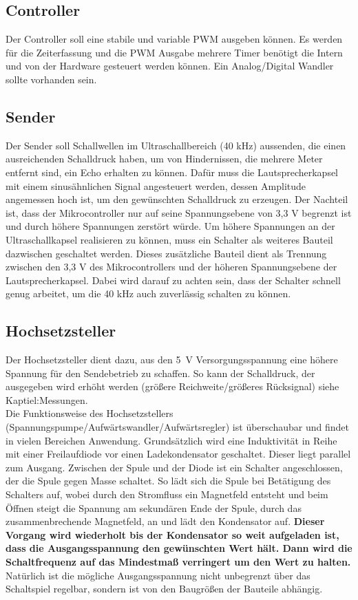 \subsection{Controller}
Der Controller soll eine stabile und variable PWM ausgeben können. Es werden für die Zeiterfassung und die PWM Ausgabe mehrere Timer benötigt die Intern und von der Hardware gesteuert werden können. Ein Analog/Digital Wandler sollte vorhanden sein.

\subsection{Sender}
Der Sender soll Schallwellen im Ultraschallbereich (40 kHz) aussenden, die einen ausreichenden Schalldruck haben, um von Hindernissen, die mehrere Meter entfernt sind, ein Echo erhalten zu können.
Dafür muss die Lautsprecherkapsel mit einem sinusähnlichen Signal angesteuert werden, dessen Amplitude angemessen hoch ist, um den gewünschten Schalldruck zu erzeugen. Der Nachteil ist, dass der Mikrocontroller nur auf seine Spannungsebene von 3,3 V begrenzt ist und durch höhere Spannungen zerstört würde.
Um höhere Spannungen an der Ultraschallkapsel realisieren zu können, muss ein Schalter als weiteres Bauteil dazwischen geschaltet werden. Dieses zusätzliche Bauteil dient als Trennung zwischen den 3,3 V des Mikrocontrollers und der höheren Spannungsebene der Lautsprecherkapsel. Dabei wird darauf zu achten sein, dass der Schalter schnell genug arbeitet, um die 40 kHz auch zuverlässig schalten zu können.

\subsection{Hochsetzsteller}
Der Hochsetzsteller dient dazu, aus den 5~V Versorgungsspannung eine höhere Spannung für den Sendebetrieb zu schaffen. So kann der Schalldruck, der ausgegeben wird erhöht werden (größere Reichweite/größeres Rücksignal) siehe Kaptiel:Messungen.\\%
Die Funktionsweise des Hochsetzstellers (Spannungspumpe/Aufwärtswandler/Aufwärtsregler) ist überschaubar und findet in vielen Bereichen Anwendung. Grundsätzlich wird eine Induktivität in Reihe mit einer Freilaufdiode vor einen Ladekondensator geschaltet. Dieser liegt parallel zum Ausgang. Zwischen der Spule und der Diode ist ein Schalter angeschlossen, der die Spule gegen Masse schaltet. So lädt sich die Spule bei Betätigung des Schalters auf, wobei durch den Stromfluss ein Magnetfeld entsteht und beim Öffnen steigt die Spannung am sekundären Ende der Spule, durch das zusammenbrechende Magnetfeld, an und lädt den Kondensator auf. \textbf{Dieser Vorgang wird wiederholt bis der Kondensator so weit aufgeladen ist, dass die Ausgangsspannung den gewünschten Wert hält. Dann wird die Schaltfrequenz auf das Mindestmaß verringert um den Wert zu halten.} Natürlich ist die mögliche Ausgangsspannung nicht unbegrenzt über das Schaltspiel regelbar, sondern ist von den Baugrößen der Bauteile abhängig. 
